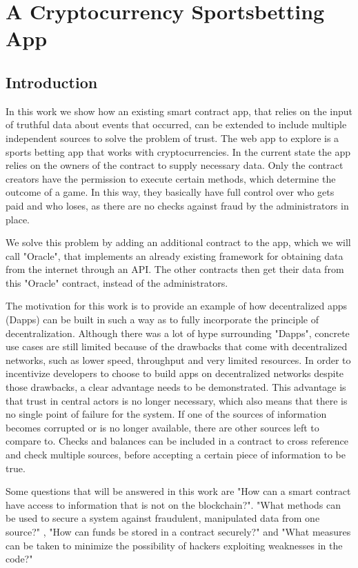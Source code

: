 \chapter{A Cryptocurrency Sportsbetting App}
\label{cha:theapp}
\section{Introduction}
In this work we show how an existing smart contract app, that relies on the input of truthful data about events that occurred, can be extended to include multiple independent sources to solve the problem of trust. The web app to explore is a sports betting app that works with cryptocurrencies. In the current state the app relies on the owners of the contract to supply necessary data. Only the contract creators have the permission to execute certain methods, which determine the outcome of a game. In this way, they basically have full control over who gets paid and who loses, as there are no checks against fraud by the administrators in place.

We solve this problem by adding an additional contract to the app, which we will call "Oracle", that implements an already existing framework for obtaining data from the internet through an API. The other contracts then get their data from this "Oracle" contract, instead of the administrators.

The motivation for this work is to provide an example of how decentralized apps (Dapps) can be built in such a way as to fully incorporate the principle of decentralization. Although there was a lot of hype surrounding "Dapps", concrete use cases are still limited because of the drawbacks that come with decentralized networks, such as lower speed, throughput and very limited resources. In order to incentivize developers to choose to build apps on decentralized networks despite those drawbacks, a clear advantage needs to be demonstrated. This advantage is that trust in central actors is no longer necessary, which also means that there is no single point of failure for the system. If one of the sources of information becomes corrupted or is no longer available, there are other sources left to compare to. Checks and balances can be included in a contract to cross reference and check multiple sources, before accepting a certain piece of information to be true.

Some questions that will be answered in this work are "How can a smart contract have access to information that is not on the blockchain?". "What methods can be used to secure a system against fraudulent, manipulated data from one source?" , "How can funds be stored in a contract securely?" and "What measures can be taken to minimize the possibility of hackers exploiting weaknesses in the code?"
